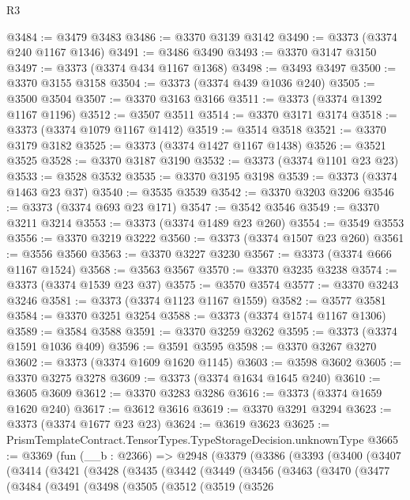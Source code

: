 \begin{lexlean}{R3}
\begin{coremodule}
@3484 := @3479 @3483
@3486 := @3370 @3139 @3142
@3490 := @3373 (@3374 @240 @1167 @1346)
@3491 := @3486 @3490
@3493 := @3370 @3147 @3150
@3497 := @3373 (@3374 @434 @1167 @1368)
@3498 := @3493 @3497
@3500 := @3370 @3155 @3158
@3504 := @3373 (@3374 @439 @1036 @240)
@3505 := @3500 @3504
@3507 := @3370 @3163 @3166
@3511 := @3373 (@3374 @1392 @1167 @1196)
@3512 := @3507 @3511
@3514 := @3370 @3171 @3174
@3518 := @3373 (@3374 @1079 @1167 @1412)
@3519 := @3514 @3518
@3521 := @3370 @3179 @3182
@3525 := @3373 (@3374 @1427 @1167 @1438)
@3526 := @3521 @3525
@3528 := @3370 @3187 @3190
@3532 := @3373 (@3374 @1101 @23 @23)
@3533 := @3528 @3532
@3535 := @3370 @3195 @3198
@3539 := @3373 (@3374 @1463 @23 @37)
@3540 := @3535 @3539
@3542 := @3370 @3203 @3206
@3546 := @3373 (@3374 @693 @23 @171)
@3547 := @3542 @3546
@3549 := @3370 @3211 @3214
@3553 := @3373 (@3374 @1489 @23 @260)
@3554 := @3549 @3553
@3556 := @3370 @3219 @3222
@3560 := @3373 (@3374 @1507 @23 @260)
@3561 := @3556 @3560
@3563 := @3370 @3227 @3230
@3567 := @3373 (@3374 @666 @1167 @1524)
@3568 := @3563 @3567
@3570 := @3370 @3235 @3238
@3574 := @3373 (@3374 @1539 @23 @37)
@3575 := @3570 @3574
@3577 := @3370 @3243 @3246
@3581 := @3373 (@3374 @1123 @1167 @1559)
@3582 := @3577 @3581
@3584 := @3370 @3251 @3254
@3588 := @3373 (@3374 @1574 @1167 @1306)
@3589 := @3584 @3588
@3591 := @3370 @3259 @3262
@3595 := @3373 (@3374 @1591 @1036 @409)
@3596 := @3591 @3595
@3598 := @3370 @3267 @3270
@3602 := @3373 (@3374 @1609 @1620 @1145)
@3603 := @3598 @3602
@3605 := @3370 @3275 @3278
@3609 := @3373 (@3374 @1634 @1645 @240)
@3610 := @3605 @3609
@3612 := @3370 @3283 @3286
@3616 := @3373 (@3374 @1659 @1620 @240)
@3617 := @3612 @3616
@3619 := @3370 @3291 @3294
@3623 := @3373 (@3374 @1677 @23 @23)
@3624 := @3619 @3623
@3625 := PrismTemplateContract.TensorTypes.TypeStorageDecision.unknownType
@3665 := @3369
    (fun (__b : @2366) =>
    @2948
      (@3379
        (@3386
          (@3393
            (@3400
              (@3407
                (@3414
                  (@3421
                    (@3428
                      (@3435
                        (@3442
                          (@3449
                            (@3456
                              (@3463
                                (@3470
                                  (@3477
                                    (@3484
                                      (@3491
                                        (@3498
                                          (@3505
                                            (@3512
                                              (@3519
                                                (@3526

\end{coremodule}
\end{lexlean}
